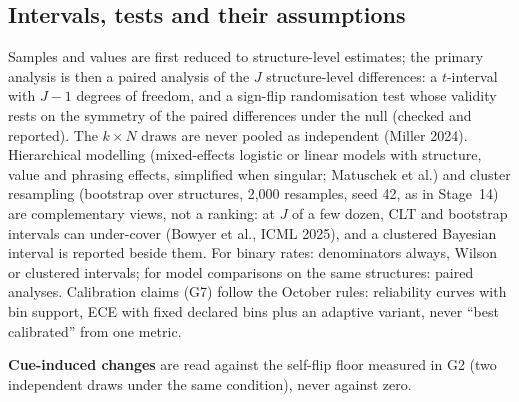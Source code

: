 \documentclass[10pt,a4paper]{article}
\begin{document}
\subsection{Intervals, tests and their assumptions}
Samples and values are first reduced to structure-level estimates; the primary analysis is then a paired analysis
of the $J$ structure-level differences: a $t$-interval with $J-1$ degrees of freedom, and a sign-flip
randomisation test whose validity rests on the symmetry of the paired differences under the null (checked and
reported). The $k\times N$ draws are never pooled as independent (Miller 2024). Hierarchical modelling (mixed-effects
logistic or linear models with structure, value and phrasing effects, simplified when singular; Matuschek et al.)
and cluster resampling (bootstrap over structures, 2,000 resamples, seed 42, as in Stage~14) are complementary
views, not a ranking: at $J$ of a few dozen, CLT and bootstrap intervals can under-cover (Bowyer et al., ICML 2025),
and a clustered Bayesian interval is reported beside them. For binary rates: denominators always, Wilson or
clustered intervals; for model comparisons on the same structures: paired analyses. Calibration claims (G7)
follow the October rules: reliability curves with bin support, ECE with fixed declared bins plus an adaptive
variant, never ``best calibrated'' from one metric.

\textbf{Cue-induced changes} are read against the self-flip floor measured in G2 (two independent draws under the
same condition), never against zero.
\end{document}
